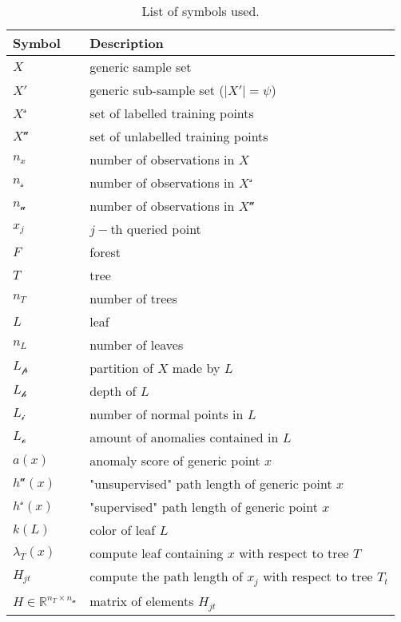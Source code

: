 \begin{table*}[]
    \centering
    \begin{tabular}{ll}
    \hline
         \textbf{Symbol} & \textbf{Description} \\
         \hline
         $X$ & generic sample set \\
         $X'$ & generic sub-sample set ($|X'|= \psi$) \\
         $X^\mathcal{s}$ & set of labelled training points\\
         $X^\mathcal{u}$ & set of unlabelled training points \\
         $n_x$ & number of observations in $X$\\
         $n_\mathcal{s}$ & number of observations in $X^\mathcal{s}$\\
         $n_\mathcal{u}$ & number of observations in $X^\mathcal{u}$\\
         $x_j$ & $j-$th queried point\\
         $F$ & forest \\
         $T$ & tree \\
         $n_T$ & number of trees\\
         $L$ & leaf \\
         $n_L$ & number of leaves \\
         $L_\mathcal{p}$ & partition of $X$ made by $L$\\
         $L_\mathcal{h}$ & depth of $L$\\
         $L_\mathcal{i}$ &  number of normal points in $L$\\
         $L_\mathcal{o}$ & amount of anomalies contained in $L$ \\
         $a(x)$ & anomaly score of generic point $x$ \\
         $h^\mathcal{u}(x)$ & "unsupervised" path length of generic point $x$ \\ 
         $h^\mathcal{s}(x)$ & "supervised" path length of generic point $x$ \\ 
         $k(L)$ & color of leaf $L$\\
         $\lambda_T(x)$ & compute leaf containing $x$ with respect to tree $T$\\
         $H_{jt}$ & compute the path length of $x_j$ with respect to tree $T_t$\\
         $H \in \mathbb{R}^{n_T \times n_\mathcal{u}}$ & matrix of elements $H_{jt}$ \\
         \hline
    \end{tabular}
    \caption{List of symbols used.}
    \label{list_sym}
\end{table*}